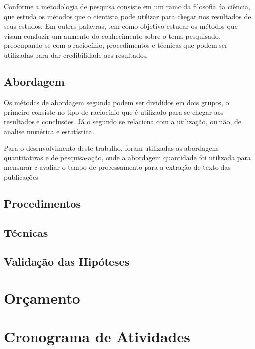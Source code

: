 Conforme \citep[p. 15]{LOVATO:metodologia} a metodologia de pesquisa
consiste em um ramo da filosofia da ciência, que estuda os métodos que
o cientista pode utilizar para chegar nos resultados de seus estudos.
Em outras palavras, tem como objetivo estudar os métodos que visam
conduzir um aumento do conhecimento sobre o tema pesquisado, preocupando-se
com o raciocínio, procedimentos e técnicas que podem ser utilizadas para
dar credibilidade aos resultados.

\subsection{Abordagem}

Os métodos de abordagem segundo \citep[p. 29]{LOVATO:metodologia} podem ser
divididos em dois grupos, o primeiro consiste no tipo de raciocínio que
é utilizado para se chegar aos resultados e conclusões. Já o segundo
se relaciona com a utilização, ou não, de analise numérica e estatística.

Para o desenvolvimento deste trabalho, foram utilizadas as abordagens
quantitativas e de pesquisa-ação, onde a abordagem quantidade foi utilizada
para mensurar e avaliar o tempo de processamento para a extração de texto
das publicações

\subsection{Procedimentos}



\subsection{Técnicas}

\subsection{Validação das Hipóteses}


\section{Orçamento} \label{sec:budget}


\section{Cronograma de Atividades} \label{sec:schedule_activities_table}

